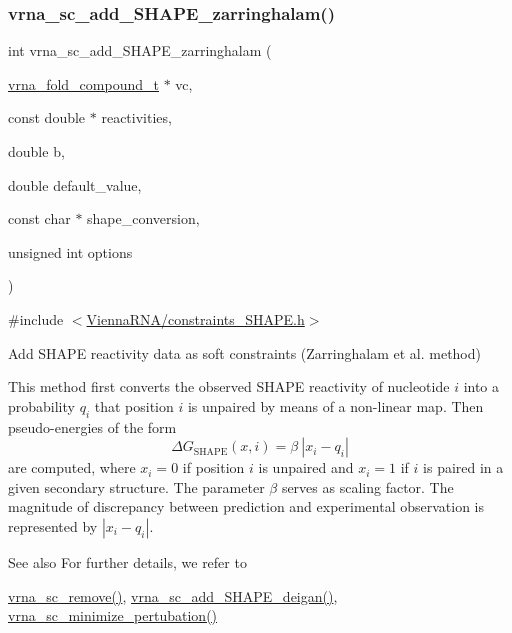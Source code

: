 \subsubsection{\texorpdfstring{vrna\+\_\+sc\+\_\+add\+\_\+\+S\+H\+A\+P\+E\+\_\+zarringhalam()}{vrna\_sc\_add\_SHAPE\_zarringhalam()}}
{\footnotesize\ttfamily int vrna\+\_\+sc\+\_\+add\+\_\+\+S\+H\+A\+P\+E\+\_\+zarringhalam (\begin{DoxyParamCaption}\item[{\hyperlink{group__fold__compound_ga1b0cef17fd40466cef5968eaeeff6166}{vrna\+\_\+fold\+\_\+compound\+\_\+t} $\ast$}]{vc,  }\item[{const double $\ast$}]{reactivities,  }\item[{double}]{b,  }\item[{double}]{default\+\_\+value,  }\item[{const char $\ast$}]{shape\+\_\+conversion,  }\item[{unsigned int}]{options }\end{DoxyParamCaption})}



{\ttfamily \#include $<$\hyperlink{constraints__SHAPE_8h}{Vienna\+R\+N\+A/constraints\+\_\+\+S\+H\+A\+P\+E.\+h}$>$}



Add S\+H\+A\+PE reactivity data as soft constraints (Zarringhalam et al. method) 

This method first converts the observed S\+H\+A\+PE reactivity of nucleotide $ i $ into a probability $ q_i $ that position $ i $ is unpaired by means of a non-\/linear map. Then pseudo-\/energies of the form \[ \Delta G_{\text{SHAPE}}(x,i) = \beta\ |x_i - q_i| \] are computed, where $ x_i=0 $ if position $ i $ is unpaired and $ x_i=1 $ if $ i $ is paired in a given secondary structure. The parameter $ \beta $ serves as scaling factor. The magnitude of discrepancy between prediction and experimental observation is represented by $ |x_i - q_i| $.

\begin{DoxySeeAlso}{See also}
For further details, we refer to \cite{zarringhalam:2012} 

\hyperlink{group__soft__constraints_ga73cdc07b9a199c614367bebef0f2c41a}{vrna\+\_\+sc\+\_\+remove()}, \hyperlink{group__SHAPE__reactivities_ga57d612b58e1c61dd6cfcb5a843f8f1b3}{vrna\+\_\+sc\+\_\+add\+\_\+\+S\+H\+A\+P\+E\+\_\+deigan()}, \hyperlink{group__perturbation_gaa124bdc20d88001c38ade590c4bcc3c4}{vrna\+\_\+sc\+\_\+minimize\+\_\+pertubation()}
\end{DoxySeeAlso}

